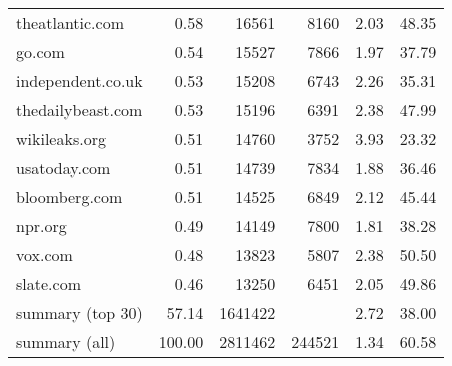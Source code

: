 \begin{tabular}{lrrrrr}
theatlantic.com       &    0.58 &    16561 &    8160 &         2.03 &         48.35 \\
go.com                &    0.54 &    15527 &    7866 &         1.97 &         37.79 \\
independent.co.uk     &    0.53 &    15208 &    6743 &         2.26 &         35.31 \\
thedailybeast.com     &    0.53 &    15196 &    6391 &         2.38 &         47.99 \\
wikileaks.org         &    0.51 &    14760 &    3752 &         3.93 &         23.32 \\
usatoday.com          &    0.51 &    14739 &    7834 &         1.88 &         36.46 \\
bloomberg.com         &    0.51 &    14525 &    6849 &         2.12 &         45.44 \\
npr.org               &    0.49 &    14149 &    7800 &         1.81 &         38.28 \\
vox.com               &    0.48 &    13823 &    5807 &         2.38 &         50.50 \\
slate.com             &    0.46 &    13250 &    6451 &         2.05 &         49.86 \\
summary (top 30)      &   57.14 &  1641422 &         &         2.72 &         38.00 \\
summary (all)         &  100.00 &  2811462 &  244521 &         1.34 &         60.58 \\
\bottomrule
\end{tabular}
